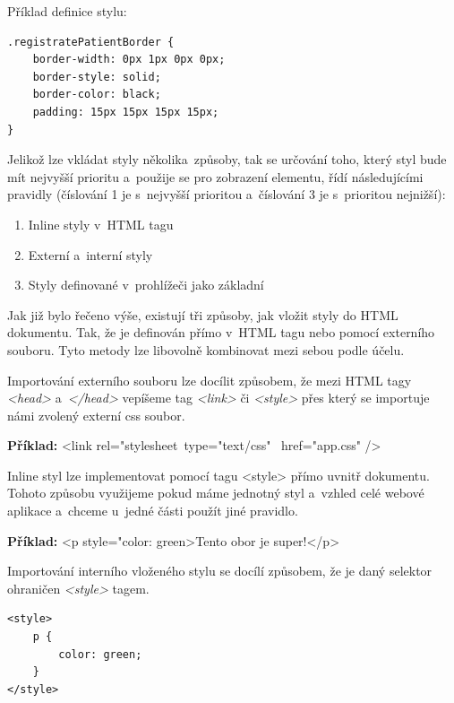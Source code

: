 Příklad definice stylu:
\begin{lstlisting}[numbers=none]
.registratePatientBorder {
    border-width: 0px 1px 0px 0px;
    border-style: solid;
    border-color: black;
    padding: 15px 15px 15px 15px;
}
\end{lstlisting}

Jelikož lze vkládat styly několika~způsoby, tak se určování toho, který styl bude mít nejvyšší prioritu a~použije se pro zobrazení elementu, řídí následujícími pravidly (číslování 1 je s~nejvyšší prioritou a~číslování 3 je s~prioritou nejnižší):

\pagebreak

\begin{enumerate}
	\item Inline styly v~HTML tagu
	\item Externí a~interní styly
	\item Styly definované v~prohlížeči jako základní
\end{enumerate}


Jak již bylo řečeno výše, existují tři způsoby, jak vložit styly do HTML dokumentu. Tak, že je definován přímo v~HTML tagu nebo pomocí externího souboru. Tyto metody lze libovolně kombinovat mezi sebou podle účelu. 

Importování externího souboru lze docílit způsobem, že mezi HTML tagy \textit{<head>} a~\textit{</head>} vepíšeme tag \textit{<link>} či \textit{<style>} přes který se importuje námi zvolený externí css soubor. \\ 

\begin{center}
	\textbf{Příklad: } <link rel="stylesheet\textquotedbl \ type="text/css" \ href="app.css" /> 
\end{center}
 
Inline styl lze implementovat pomocí tagu <style> přímo uvnitř dokumentu. Tohoto způsobu využijeme pokud máme jednotný styl a~vzhled celé webové aplikace a~chceme u~jedné části použít jiné pravidlo.

\begin{center}
	\textbf{Příklad: }  <p style="color: green\textquotedbl>Tento obor je super!</p> 
\end{center}

Importování interního vloženého stylu se docílí způsobem, že je daný selektor ohraničen \textit{<style>} tagem.

\begin{lstlisting}[numbers=none]
<style>
	p {
		color: green;
	}
</style> 
\end{lstlisting}

